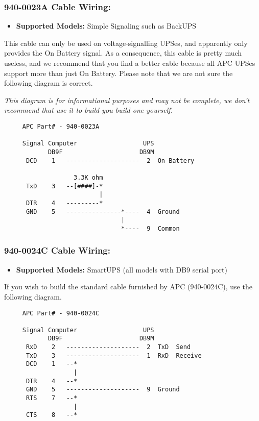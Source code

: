 \subsubsection*{940-0023A Cable Wiring:}

\begin{itemize}
\item {\bf Supported Models:} Simple Signaling such as BackUPS
\end{itemize}

This cable can only be
used on voltage-signalling UPSes, and apparently only provides the On Battery
signal. As a consequence, this cable is pretty much useless, and we recommend
that you find a better cable because all APC UPSes support more than just On
Battery. Please note that we are not sure the following diagram is correct. 

\emph{This diagram is for informational purposes and may not be complete, we don't
recommend that use it to build you build one yourself.}
\footnotesize
\begin{verbatim}
     APC Part# - 940-0023A
     
     Signal Computer                  UPS
            DB9F                     DB9M
      DCD    1   --------------------  2  On Battery
     
                   3.3K ohm
      TxD    3   --[####]-*
                          |
      DTR    4   ---------*
      GND    5   ---------------*----  4  Ground
                                |
                                *----  9  Common
\end{verbatim}
\normalsize

\subsubsection*{940-0024C Cable Wiring:}

\begin{itemize}
\item {\bf Supported Models:} SmartUPS (all models with DB9 serial port)
\end{itemize}

If you wish to build the standard cable furnished by APC (940-0024C), use the
following diagram. 

\footnotesize
\begin{verbatim}
     APC Part# - 940-0024C
     
     Signal Computer                  UPS
            DB9F                     DB9M
      RxD    2   --------------------  2  TxD  Send
      TxD    3   --------------------  1  RxD  Receive
      DCD    1   --*
                   |
      DTR    4   --*
      GND    5   --------------------  9  Ground
      RTS    7   --*
                   |
      CTS    8   --*
\end{verbatim}
\normalsize

